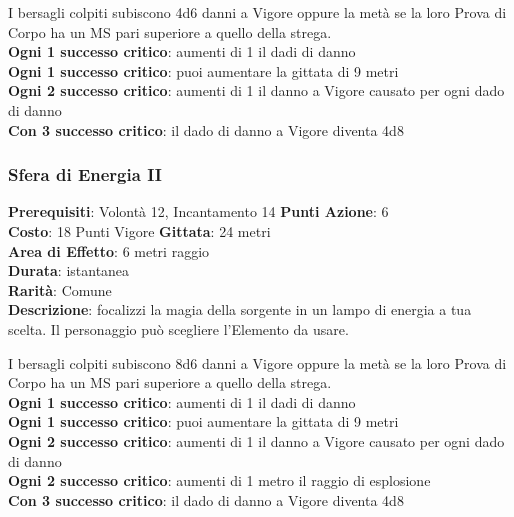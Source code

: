 \documentclass[12pt,a4paper,twoside,openany]{book}
\begin{document}
\begin{multicols}{2}
I bersagli colpiti subiscono 4d6 danni a Vigore oppure la metà se la loro Prova di Corpo ha un MS pari superiore a quello della strega.\\
\textbf{Ogni 1 successo critico}: aumenti di 1 il dadi di danno\\
\textbf{Ogni 1 successo critico}: puoi aumentare la gittata di 9 metri\\
\textbf{Ogni 2 successo critico}: aumenti di 1 il danno a Vigore causato per ogni dado di danno\\
\textbf{Con 3 successo critico}: il dado di danno a Vigore diventa 4d8


\subsubsection*{Sfera di Energia II}
\textbf{Prerequisiti}: Volontà 12, Incantamento 14
\textbf{Punti Azione}: 6\\
\textbf{Costo}: 18 Punti Vigore
\textbf{Gittata}: 24 metri\\
\textbf{Area di Effetto}: 6 metri raggio\\
\textbf{Durata}: istantanea\\
\textbf{Rarità}: Comune\\
\textbf{Descrizione}: focalizzi la magia della sorgente in un lampo di energia a tua scelta. Il personaggio può scegliere l'Elemento da usare.

I bersagli colpiti subiscono 8d6 danni a Vigore oppure la metà se la loro Prova di Corpo ha un MS pari superiore a quello della strega.\\
\textbf{Ogni 1 successo critico}: aumenti di 1 il dadi di danno\\
\textbf{Ogni 1 successo critico}: puoi aumentare la gittata di 9 metri\\
\textbf{Ogni 2 successo critico}: aumenti di 1 il danno a Vigore causato per ogni dado di danno\\
\textbf{Ogni 2 successo critico}: aumenti di 1 metro il raggio di esplosione\\
\textbf{Con 3 successo critico}: il dado di danno a Vigore diventa 4d8


\end{multicols}
\end{document}
